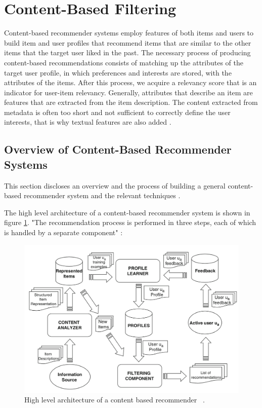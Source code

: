 
\section{Content-Based Filtering}\label{section:content_based_filtering}

Content-based recommender systems employ features of both items and users to build item and user profiles that recommend items that are similar to the other items that the target user liked in the past. The necessary process of producing content-based recommendations consists of matching up the attributes of the target user profile, in which preferences and interests are stored, with the attributes of the items. After this process, we acquire a relevancy score that is an indicator for user-item relevancy. Generally, attributes that describe an item are features that are extracted from the item description. The content extracted from metadata is often too short and not sufficient to correctly define the user interests, that is why textual features are also added \cite{de2015semantics}.

\subsection{Overview of Content-Based Recommender Systems}

This section discloses an overview and the process of building a general content-based recommender system and the relevant techniques \cite{de2015semantics}.

The high level architecture of a content-based recommender system is shown in figure \ref{fig:high-level-content-based}. "The recommendation process is performed in three steps, each of which is handled by a separate component" \cite{de2015semantics}:

\begin{figure}[htp]
	\centering
	\includegraphics[width=\textwidth]{figures/HighLevelContentBased.png}
	\caption{High level architecture of a content based recommender  ~\parencite{de2015semantics}.}
	\label{fig:high-level-content-based}
\end{figure}



